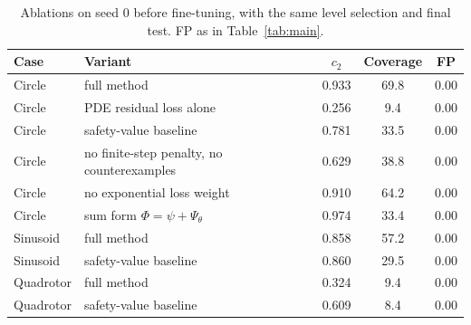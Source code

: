 \begin{table}[ht]
\centering\small
\caption{Ablations on seed 0 before fine-tuning, with the same level selection and final test. FP as in Table~\ref{tab:main}.}
\label{tab:ablation}
\begin{tabular}{llccc}
\toprule
Case & Variant & $c_2$ & Coverage & FP\\
\midrule
Circle & full method & 0.933 & 69.8 & 0.00\\
Circle & PDE residual loss alone & 0.256 & 9.4 & 0.00\\
Circle & safety-value baseline & 0.781 & 33.5 & 0.00\\
Circle & no finite-step penalty, no counterexamples & 0.629 & 38.8 & 0.00\\
Circle & no exponential loss weight & 0.910 & 64.2 & 0.00\\
Circle & sum form $\Phi=\psi+\Psi_\theta$ & 0.974 & 33.4 & 0.00\\
Sinusoid & full method & 0.858 & 57.2 & 0.00\\
Sinusoid & safety-value baseline & 0.860 & 29.5 & 0.00\\
Quadrotor & full method & 0.324 & 9.4 & 0.00\\
Quadrotor & safety-value baseline & 0.609 & 8.4 & 0.00\\
\bottomrule
\end{tabular}
\end{table}
